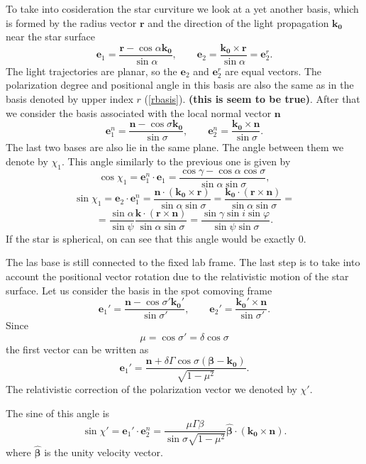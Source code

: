 \documentclass[14pt]{article}
\newcommand{\be}{\begin{equation}}
\newcommand{\ee}{\end{equation}}
\begin{document}
			To take into cosideration the star curviture we look at a yet another basis, which is formed by the radius vector $\bm{r}$ and the direction of the light propagation $\bm{k_0}$ near the star surface
			\be\label{basis}
			\bm{e}_1 = \frac{\bm{r}-\cos{\alpha} \bm{k_0}}{\sin{\alpha}},\qquad 
			\bm{e}_2 = \frac{\bm{k_0} \times \bm{r}}{\sin{\alpha}}=\bm{e}^r_2.
			\ee
			The light trajectories are planar, so the $\bm{e}_2$ and $\bm{e}^r_2$ are equal vectors. The polarization degree and positional angle in this basis are also the same as in the basis denoted by upper index $r$ (\ref{rbasis}). \textbf{(this is seem to be true)}.
			After that we consider the basis associated with the local normal vector  $\bm n $
			\be\label{nbasis}
			\bm{e}_1^n = \frac{\bm{n}-\cos{\sigma} \bm{k_0}}{\sin{\sigma}},\qquad 
			\bm{e}_2^n = \frac{\bm{k_0} \times \bm{n}}{\sin{\sigma}} .
			\ee
			The last two bases are also lie in the same plane. The angle between them we denote by $\chi_1$.
			This angle similarly to the previous one is given by  \be
			\cos{\chi_1}=\bm{e}_1^n \cdot \bm{e}_1 = \frac{\cos\gamma-\cos\alpha\cos\sigma}{\sin{\alpha}\sin\sigma} , 
			\ee $$ 
			\sin{\chi_1}= \bm{e}_2 \cdot \bm{e}^n_1 = \frac{\bm{n} \cdot (\bm{k_0}\times\bm{r} )}{\sin\alpha\sin\sigma}
			= \frac{\bm{k_0} \cdot (\bm{r}\times\bm{n} )}{\sin\alpha\sin\sigma}=
			$$\be
			= \frac{\sin\alpha}{\sin\psi} \frac{ \bm{k} \cdot (\bm{r}\times\bm{n} )}{\sin\alpha\sin\sigma}
			= \frac{ \sin\gamma\sin i \sin\varphi}{\sin\psi\sin\sigma}.
			\ee
			If the star is spherical, on can see that this angle would be exactly $0$.

			The las base is still connected to the fixed lab frame. 
			The last step is to take into account the positional vector rotation due to the relativistic motion of the star surface.
			Let us consider the basis in the spot comoving frame
			\be\label{primebasis}
				\bm{e}_1' = \frac{\bm{n}-\cos{\sigma'} \bm{k_0'}}{\sin{\sigma'}},\qquad 
				\bm{e}_2' = \frac{\bm{k_0'} \times \bm{n}}{\sin{\sigma'}} .
			\ee
			Since \be
				\mu=\cos\sigma'=\delta\cos{\sigma} 
			\ee
			the first vector can be written as 
			\be
			\bm{e}_1' = \frac{\bm{n}+\delta\Gamma\cos{\sigma} (\bm{\beta-k_0})}{\sqrt{1-\mu^2 } }.
			\ee
			The relativistic correction of the polarization vector we denoted by $\chi'$.

			The sine of this angle is
			\be\label{sinchi}
			\sin{\chi'}=\bm{e}_1'\cdot \bm{e}_2^n =
			 \frac{\mu\Gamma\beta }{\sin{\sigma}\sqrt{1-\mu^2} } \bm{\hat\beta} \cdot(\bm{k_0} \times \bm{n}).
			\ee
			where $\bm{\hat\beta}$ is the unity velocity vector.
			
\end{document}
